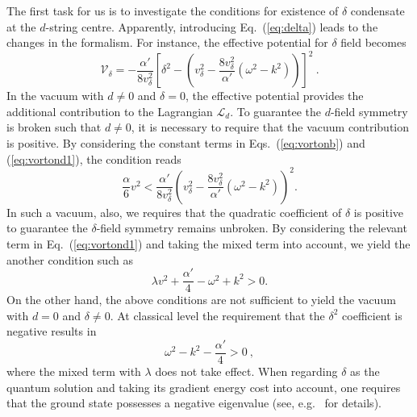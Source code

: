 \documentclass[12pt]{article}
\begin{document}
The first task for us is to investigate the conditions for existence of $\delta$ condensate at the $d$-string centre.
Apparently, introducing Eq.~(\ref{eq:delta}) leads to the changes in the formalism.
For instance, the effective potential for $\delta$ field becomes
\begin{equation}    \label{eq:vortond1}
  \mathcal{V}_\delta= -\frac{\alpha'}{8v_\delta^2} [\delta^2 - (v_\delta^2 - \frac{8v_\delta^2}{\alpha'}(\omega^2 -k^2))]^2 \ .\end{equation}
In the vacuum with $d \neq 0$ and $\delta = 0$, the effective potential provides the additional
contribution to the Lagrangian $\mathcal{L}_d$. To guarantee the $d$-field symmetry is broken such
that $d \neq 0$, it is necessary to require that the vacuum contribution is positive.
By considering the constant terms in Eqs.~(\ref{eq:vortonb}) and (\ref{eq:vortond1}), the condition reads
\begin{equation}
\label{eq:vortonb2}
  \frac{\alpha}{6} v^2 < \frac{\alpha'}{8v_\delta^2}(v_\delta^2  - \frac{8v_\delta^2}{\alpha'}(\omega^2 -k^2))^2.
\end{equation}
In such a vacuum, also, we requires that the quadratic
coefficient of $\delta$ is positive to guarantee the
$\delta$-field symmetry remains unbroken.
By considering the relevant term in Eq.~(\ref{eq:vortond1}) and taking the mixed
term into account, we yield the another condition such as
\begin{equation}
  \label{eq:vortonb3}
  \lambda v^2 + \frac{\alpha'}{4}- \omega^2 +k^2 > 0.
\end{equation}
On the other hand, the above conditions are not sufficient to yield the vacuum
with $d = 0$ and $\delta \neq 0$.
At classical level the requirement that the $\delta^2$ coefficient is negative results in
\begin{equation}
  \label{eq:vortonb4}
\omega^2 - k^2 -\frac{\alpha'}{4} > 0 \ ,
\end{equation}
where the mixed term with $\lambda$ does not take effect. When regarding $\delta$ as 
the quantum solution and taking its gradient energy cost into account, one requires that the ground state possesses a negative eigenvalue (see, e.g.~\cite{vilenkin2000cosmic,haws1988superconducting} for details).
\end{document}
